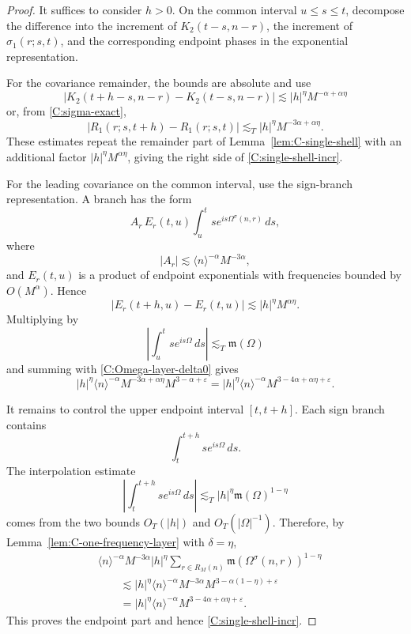 \documentclass[10pt]{amsart}
\numberwithin{equation}{section}
\theoremstyle{plain}
\theoremstyle{definition}
\theoremstyle{remark}
\newcommand{\eps}{\varepsilon}
\newcommand{\la}{\langle}
\newcommand{\ra}{\rangle}
\newcommand{\frakm}{\mathfrak{m}}
\begin{document}
\begin{proof}
It suffices to consider \(h>0\).  On the common interval \(u\le s\le t\), decompose the difference into the increment of \(K_2(t-s,n-r)\), the increment of \(\sigma_1(r;s,t)\), and the corresponding endpoint phases in the exponential representation.

For the covariance remainder, the bounds are absolute and use
\[
        |K_2(t+h-s,n-r)-K_2(t-s,n-r)|
        \lesssim |h|^\eta M^{-\alpha+\alpha\eta}
\]
or, from \eqref{C:sigma-exact},
\[
        |R_1(r;s,t+h)-R_1(r;s,t)|
        \lesssim_T |h|^\eta M^{-3\alpha+\alpha\eta}.
\]
These estimates repeat the remainder part of Lemma~\ref{lem:C-single-shell} with an additional factor \(|h|^\eta M^{\alpha\eta}\), giving the right side of \eqref{C:single-shell-incr}.

For the leading covariance on the common interval, use the sign-branch representation.  A branch has the form
\[
        A_r\,E_r(t,u)\int_u^t s e^{is\Omega^\sigma(n,r)}\,ds,
\]
where
\[
        |A_r|\lesssim \la n\ra^{-\alpha}M^{-3\alpha},
\]
and \(E_r(t,u)\) is a product of endpoint exponentials with frequencies bounded by \(O(M^\alpha)\).  Hence
\[
        |E_r(t+h,u)-E_r(t,u)|
        \lesssim |h|^\eta M^{\alpha\eta}.
\]
Multiplying by
\[
        \left|\int_u^t s e^{is\Omega}\,ds\right|\lesssim_T\frakm(\Omega)
\]
and summing with \eqref{C:Omega-layer-delta0} gives
\[
        |h|^\eta\la n\ra^{-\alpha}M^{-3\alpha+\alpha\eta}
        M^{3-\alpha+\eps}
        =|h|^\eta\la n\ra^{-\alpha}M^{3-4\alpha+\alpha\eta+\eps}.
\]

It remains to control the upper endpoint interval \([t,t+h]\).  Each sign branch contains
\[
        \int_t^{t+h} s e^{is\Omega}\,ds.
\]
The interpolation estimate
\begin{equation}\label{C:endpoint-interpolation}
        \left|\int_t^{t+h} s e^{is\Omega}\,ds\right|
        \lesssim_T |h|^\eta\frakm(\Omega)^{1-\eta}
\end{equation}
comes from the two bounds \(O_T(|h|)\) and \(O_T(|\Omega|^{-1})\).  Therefore, by Lemma~\ref{lem:C-one-frequency-layer} with \(\delta=\eta\),
\[
\begin{aligned}
        &\la n\ra^{-\alpha}M^{-3\alpha}|h|^\eta
        \sum_{r\in R_M(n)}\frakm(\Omega^\sigma(n,r))^{1-\eta}   \\
        &\qquad\lesssim
        |h|^\eta\la n\ra^{-\alpha}M^{-3\alpha}
        M^{3-\alpha(1-\eta)+\eps}                              \\
        &\qquad=
        |h|^\eta\la n\ra^{-\alpha}M^{3-4\alpha+\alpha\eta+\eps}.
\end{aligned}
\]
This proves the endpoint part and hence \eqref{C:single-shell-incr}.
\end{proof}
\end{document}

